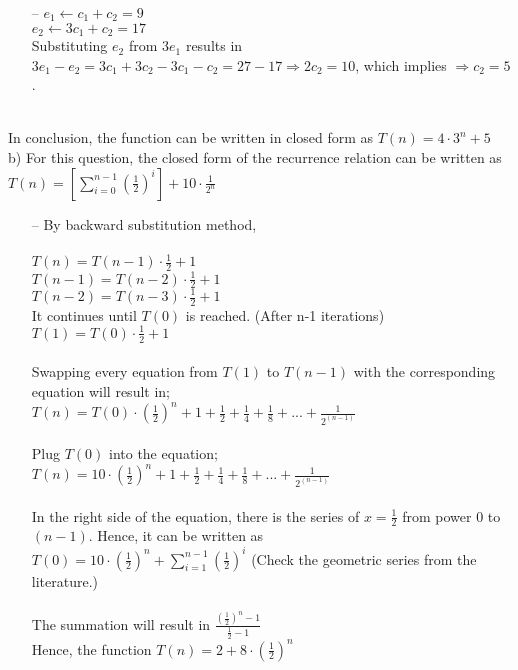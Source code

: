 \documentclass[12pt]{article}
\begin{document}
  \begin{itemize}
    \item[--] $ e_{1} \gets c_{1} + c_{2} = 9$ \\
          $ e_{2} \gets 3c_{1} + c_{2} = 17$ \\
          Substituting $e_{2}$ from $3e_{1}$ results in \newline $3e_{1} - e_{2} = 3c_{1} + 3c_{2} - 3c_{1} - c_{2} = 27 - 17 \Longrightarrow 2c_{2} = 10$, \newline which implies $\Longrightarrow c_{2} = 5$.
  \end{itemize} \\

  In conclusion, the function can be written in closed form as \newline $T(n) = 4 \cdot 3^n + 5$ \\

  b) For this question, the closed form of the recurrence relation can be written as $T(n) = [\sum_{i=0}^{n-1}(\frac{1}{2})^{i}] + 10 \cdot \frac{1}{2^{n}} $ \\

  \begin{itemize}
    \item[--] By backward substitution method, \\\\
              $T(n) = T(n-1) \cdot \frac{1}{2} + 1$ \\
              $T(n-1) = T(n-2) \cdot \frac{1}{2} + 1$ \\
              $T(n-2) = T(n-3) \cdot \frac{1}{2} + 1$ \\
              It continues until $T(0)$ is reached. (After n-1 iterations) \\
              $T(1) = T(0) \cdot \frac{1}{2} + 1$ \\\\
              Swapping every equation from $T(1)$ to $T(n-1)$ with the corresponding equation will result in; \\
              $T(n) = T(0) \cdot (\frac{1}{2})^n + 1 + \frac{1}{2} + \frac{1}{4} + \frac{1}{8} + ... + \frac{1}{2^{(n-1)}}$ \\\\
              Plug $T(0)$ into the equation; \\
              $T(n) = 10 \cdot (\frac{1}{2})^n + 1 + \frac{1}{2} + \frac{1}{4} + \frac{1}{8} + ... + \frac{1}{2^{(n-1)}}$ \\\\
              In the right side of the equation, there is the series of $x=\frac{1}{2}$ from power $0$ to $(n-1)$. Hence, it can be written as \\
              $T(0) = 10 \cdot (\frac{1}{2})^n + \sum_{i=1}^{n-1}(\frac{1}{2})^i$ (Check the geometric series from the literature.)\\\\
              The summation will result in $\frac{(\frac{1}{2})^n - 1}{\frac{1}{2} - 1} $ \\
              Hence, the function $T(n) = 2 + 8 \cdot (\frac{1}{2})^n$


  \end{itemize}
\end{document}
